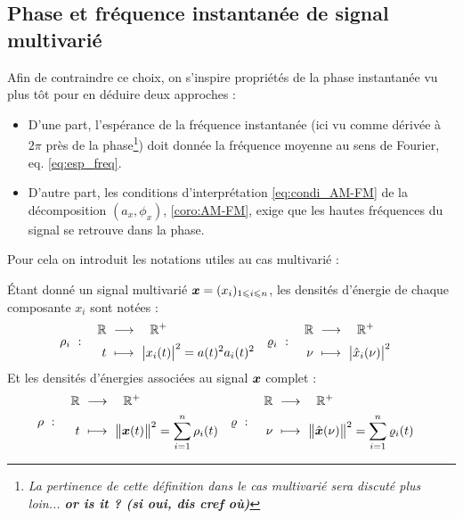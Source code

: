 \subsection{Phase et fréquence instantanée de signal multivarié }\label{sec:param_instant_nvar}

Afin de contraindre ce choix, on s'inspire propriétés de la phase instantanée vu plus tôt pour en déduire deux approches :
\begin{itemize}
	\item D'une part, l'espérance de la fréquence instantanée (ici vu comme dérivée à $2\pi$ près de la phase\footnote{\itshape
		La pertinence de cette définition dans le cas multivarié sera discuté plus loin... \textbf{or is it ? (si oui, dis cref où)}})
	doit donnée la fréquence moyenne au sens de Fourier, eq. \eqref{eq:esp_freq}.
	
	\item D'autre part, les conditions d'interprétation \eqref{eq:condi_AM-FM} de la décomposition $(a_x,\phi_x)$, \cref{coro:AM-FM}, exige que les hautes fréquences du signal se retrouve dans la phase.
\end{itemize}

Pour cela on introduit les notations utiles au cas multivarié :
\begin{definition}\label{def:densi_dE-mv}
	Étant donné un signal multivarié $\bf{x}=(x_i)_{1\leq i\leq n}$, les densités d'énergie de chaque composante $x_i$  sont notées :
	\begin{align}\label{eq:densi_dEi}
		\densit_i\ &:\quad \begin{aligned}\R\ &\lr\quad \R^+ \\ t\ &\longmapsto\ \big|x_i(t)\big|^2 = a(t)^2 a_i(t)^2 \end{aligned}  
		&
		\densis_i\ &:\quad \begin{aligned}\R\ &\lr\quad \R^+ \\ \nu\ &\longmapsto\ \big|\fou{x}_i(\nu)\big|^2 \end{aligned}
	\end{align}
	Et les densités d'énergies associées au signal $\bf{x}$ complet :
	\begin{align}\label{eq:densi_dE-mv}
		\densit\ &:\quad \begin{aligned}\R\ &\lr\quad \R^+ \\ t\ &\longmapsto\ \big\|\bf{x}(t)\big\|^2 = \sum_{i=1}^n \densit_i(t) \end{aligned}  
		&
		\densis\ &:\quad \begin{aligned}\R\ &\lr\quad \R^+ \\ \nu\ &\longmapsto\ \big\|\fou{\bf{x}}(\nu)\big\|^2 = \sum_{i=1}^n \densis_i(t) \end{aligned}	
	\end{align}
\end{definition}
\skipl

